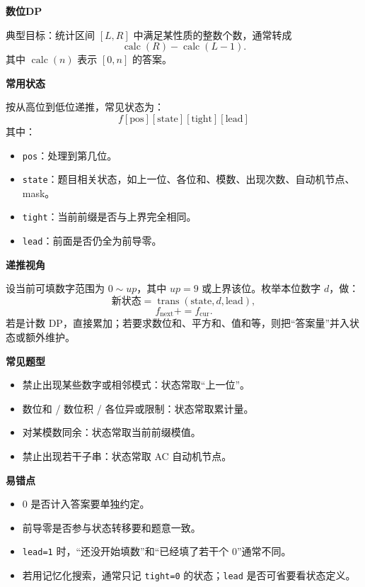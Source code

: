 \textbf{数位DP}

典型目标：统计区间 $[L,R]$ 中满足某性质的整数个数，通常转成
\[
\operatorname{calc}(R)-\operatorname{calc}(L-1).
\]
其中 $\operatorname{calc}(n)$ 表示 $[0,n]$ 的答案。

\textbf{常用状态}

按从高位到低位递推，常见状态为：
\[
f[\text{pos}][\text{state}][\text{tight}][\text{lead}]
\]
其中：
\begin{itemize}
	\item \texttt{pos}：处理到第几位。
	\item \texttt{state}：题目相关状态，如上一位、各位和、模数、出现次数、自动机节点、mask。
	\item \texttt{tight}：当前前缀是否与上界完全相同。
	\item \texttt{lead}：前面是否仍全为前导零。
\end{itemize}

\textbf{递推视角}

设当前可填数字范围为 $0\sim up$，其中 $up=9$ 或上界该位。枚举本位数字 $d$，做：
\[
\text{新状态} = \operatorname{trans}(\text{state}, d, \text{lead}),
\]
\[
f_{\text{next}} += f_{\text{cur}}.
\]
若是计数 DP，直接累加；若要求数位和、平方和、值和等，则把“答案量”并入状态或额外维护。

\textbf{常见题型}

\begin{itemize}
	\item 禁止出现某些数字或相邻模式：状态常取“上一位”。
	\item 数位和 / 数位积 / 各位异或限制：状态常取累计量。
	\item 对某模数同余：状态常取当前前缀模值。
	\item 禁止出现若干子串：状态常取 AC 自动机节点。
\end{itemize}

\textbf{易错点}

\begin{itemize}
	\item $0$ 是否计入答案要单独约定。
	\item 前导零是否参与状态转移要和题意一致。
	\item \texttt{lead=1} 时，“还没开始填数”和“已经填了若干个 $0$”通常不同。
	\item 若用记忆化搜索，通常只记 \texttt{tight=0} 的状态；\texttt{lead} 是否可省要看状态定义。
\end{itemize}

